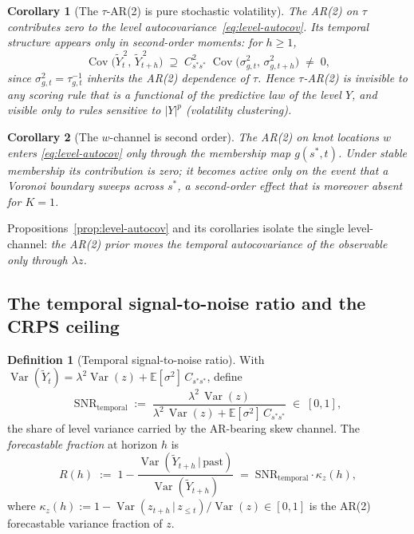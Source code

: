 \documentclass[11pt]{article}
\newtheorem{corollary}{Corollary}
\theoremstyle{definition}
\newtheorem{definition}{Definition}
\newcommand{\E}{\mathbb{E}}
\newcommand{\Var}{\operatorname{Var}}
\newcommand{\Cov}{\operatorname{Cov}}
\newcommand{\given}{\,\vert\,}
\newcommand{\SNR}{\mathrm{SNR}_{\mathrm{temporal}}}
\begin{document}
\begin{corollary}[The $\tau$-AR(2) is pure stochastic volatility]
\label{cor:tau-volatility}
The AR(2) on $\tau$ contributes \emph{zero} to the level
autocovariance~\eqref{eq:level-autocov}. Its temporal structure
appears only in second-order moments: for $h\ge1$,
\begin{equation}
  \Cov\big(\widetilde Y_t^{\,2},\,\widetilde Y_{t+h}^{\,2}\big)
   \;\supseteq\;
   C_{s^*s^*}^2\;
   \Cov\big(\sigma_{g,t}^2,\,\sigma_{g,t+h}^2\big)
   \;\ne\; 0,
  \label{eq:vol-cluster}
\end{equation}
since $\sigma_{g,t}^2 = \tau_{g,t}^{-1}$ inherits the AR(2) dependence
of $\tau$. Hence $\tau$-AR(2) is invisible to any scoring rule that is
a functional of the predictive law of the \emph{level} $Y$, and
visible only to rules sensitive to $|Y|^p$ (volatility clustering).
\end{corollary}

\begin{corollary}[The $w$-channel is second order]
\label{cor:w-channel}
The AR(2) on knot locations $w$ enters \eqref{eq:level-autocov} only
through the membership map $g(s^*,t)$. Under stable membership its
contribution is zero; it becomes active only on the event that a
Voronoi boundary sweeps across $s^*$, a second-order effect that is
moreover absent for $K=1$.
\end{corollary}

Propositions~\ref{prop:level-autocov} and its corollaries isolate the
single level-channel: \emph{the AR(2) prior moves the temporal
autocovariance of the observable only through $\lambda z$.}

\subsection{The temporal signal-to-noise ratio and the CRPS ceiling}

\begin{definition}[Temporal signal-to-noise ratio]
\label{def:snr}
With $\Var(\widetilde Y_t) = \lambda^2\Var(z) + \E[\sigma^2]\,
C_{s^*s^*}$, define
\begin{equation}
  \SNR \;:=\; \frac{\lambda^2\,\Var(z)}
                   {\lambda^2\,\Var(z) + \E[\sigma^2]\,C_{s^*s^*}}
  \;\in\;[0,1],
  \label{eq:snr}
\end{equation}
the share of level variance carried by the AR-bearing skew channel.
The \emph{forecastable fraction} at horizon $h$ is
\begin{equation}
  R(h) \;:=\; 1 - \frac{\Var(\widetilde Y_{t+h}\given\text{past})}
                       {\Var(\widetilde Y_{t+h})}
        \;=\; \SNR \cdot \kappa_z(h),
  \label{eq:Rh}
\end{equation}
where $\kappa_z(h) := 1 - \Var(z_{t+h}\given z_{\le t})/\Var(z)
\in[0,1]$ is the AR(2) forecastable variance fraction of $z$.
\end{definition}
\end{document}
